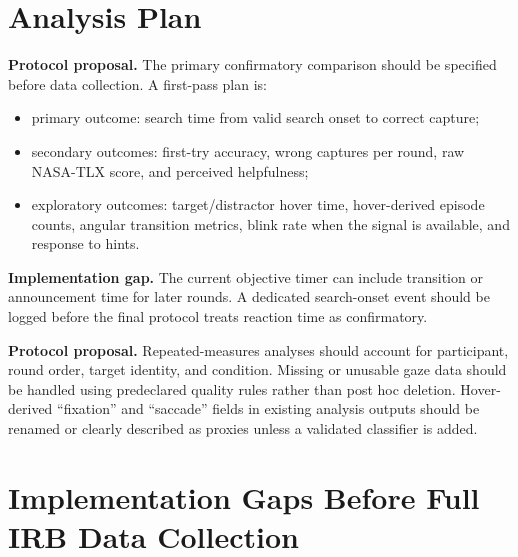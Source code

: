 \documentclass[11pt,letterpaper]{article}
\newcommand{\status}[1]{\textbf{#1.}}
\begin{document}
\section{Analysis Plan}

\status{Protocol proposal} The primary confirmatory comparison should be specified before data collection. A first-pass plan is:
\begin{itemize}
  \item primary outcome: search time from valid search onset to correct capture;
  \item secondary outcomes: first-try accuracy, wrong captures per round, raw NASA-TLX score, and perceived helpfulness;
  \item exploratory outcomes: target/distractor hover time, hover-derived episode counts, angular transition metrics, blink rate when the signal is available, and response to hints.
\end{itemize}

\status{Implementation gap} The current objective timer can include transition or announcement time for later rounds. A dedicated search-onset event should be logged before the final protocol treats reaction time as confirmatory.

\status{Protocol proposal} Repeated-measures analyses should account for participant, round order, target identity, and condition. Missing or unusable gaze data should be handled using predeclared quality rules rather than post hoc deletion. Hover-derived ``fixation'' and ``saccade'' fields in existing analysis outputs should be renamed or clearly described as proxies unless a validated classifier is added.

\section{Implementation Gaps Before Full IRB Data Collection}
\end{document}

